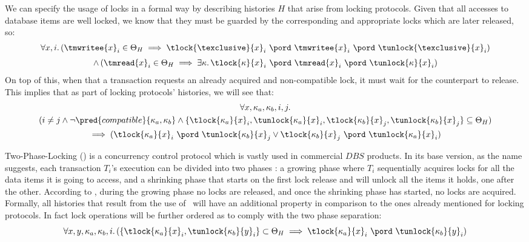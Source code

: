 We can specify the usage of locks in a formal way by describing histories $H$ that arise from locking protocols. Given that all accesses to database items are well locked, we know that they must be guarded by the corresponding and appropriate locks which are later released, so:
\begin{gather*}
	\forall x, i \ldotp \left( \tmwritee{x}_i \in \Theta_H \implies \tlock{\texclusive}{x}_i\ \pord\ \tmwritee{x}_i\ \pord\ \tunlock{\texclusive}{x}_i \right) \\[0.3em]
	\land \left( \tmread{x}_i \in \Theta_H \implies \exists \kappa \ldotp \tlock{\kappa}{x}_i\ \pord\ \tmread{x}_i\ \pord\ \tunlock{\kappa}{x}_i \right)
\end{gather*}
On top of this, when that a transaction requests an already acquired and non-compatible lock, it must wait for the counterpart to release. This implies that as part of locking protocols' histories, we will see that:
\begin{gather*}
	\forall x, \kappa_a, \kappa_b, i, j \ldotp \\
	(i \neq j \land \lnot \pred{compatible}{\kappa_a, \kappa_b} \land \{ \tlock{\kappa_a}{x}_i, \tunlock{\kappa_a}{x}_i, \tlock{\kappa_b}{x}_j, \tunlock{\kappa_b}{x}_j \}\subseteq \Theta_H) \\
	 \implies (\tlock{\kappa_a}{x}_i\ \pord\ \tunlock{\kappa_b}{x}_j \lor \tlock{\kappa_b}{x}_j\ \pord\ \tunlock{\kappa_a}{x}_i)
\end{gather*}

Two-Phase-Locking (\tpl) is a concurrency control protocol which is vastly used in commercial $DBS$ products. In its base version, as the name suggests, each transaction $T_i$'s execution can be divided into two phases \cite{ccontrol}: a growing phase where $T_i$ sequentially acquires locks for all the data items it is going to access, and a shrinking phase that starts on the first lock release and will unlock all the items it holds, one after the other. According to \tpl, during the growing phase no locks are released, and once the shrinking phase has started, no locks are acquired. Formally, all histories that result from the use of \tpl\ will have an additional property in comparison to the ones already mentioned for locking protocols. In fact lock operations will be further ordered as to comply with the two phase separation:
\[
	\forall x, y, \kappa_a, \kappa_b, i \ldotp (\{ \tlock{\kappa_a}{x}_i, \tunlock{\kappa_b}{y}_i \} \subset \Theta_H \implies \tlock{\kappa_a}{x}_i\ \pord\ \tunlock{\kappa_b}{y}_i)
\]

